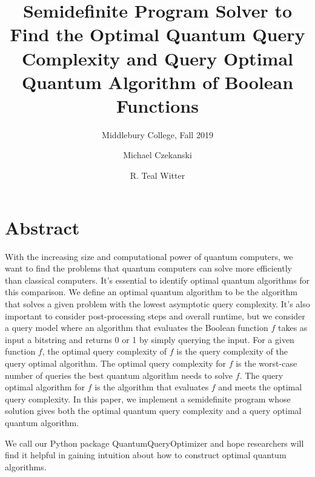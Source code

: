 \documentclass[acmtog]{acmart}
\begin{document}
\title{Semidefinite Program Solver to 
Find the Optimal Quantum Query Complexity
and Query Optimal Quantum Algorithm
of Boolean Functions}

\subtitle{Middlebury College, Fall 2019}

\author{Michael Czekanski}

\author{R. Teal Witter}

\maketitle

\graphicspath{{./../figures/}}
\section*{Abstract}

With the increasing size and computational power of quantum
computers, we want to find the problems that quantum computers
can solve more efficiently than classical computers.
It's essential to identify optimal quantum algorithms for this
comparison. We define an optimal quantum algorithm to be the
algorithm that solves a given problem with the lowest
asymptotic query complexity. It's also important to consider
post-processing steps and overall runtime, but we consider a
query model where an algorithm that evaluates the Boolean
function $f$ takes as input a bitstring and returns 0 or 1
by simply querying the input. For a given function $f$, the
optimal query complexity of $f$ is the query complexity of the
query optimal algorithm. The optimal query complexity for $f$
is the worst-case number of queries the best
quantum algorithm needs to solve $f$.
The query optimal algorithm for $f$ is
the algorithm that evaluates $f$ and
meets the optimal query complexity.
In this paper, we implement a semidefinite program
whose solution gives both the optimal quantum query
complexity and a query optimal quantum algorithm.

We call our Python package QuantumQueryOptimizer
and hope researchers will find it helpful
in gaining intuition about how to construct optimal
quantum algorithms.









\end{document}
